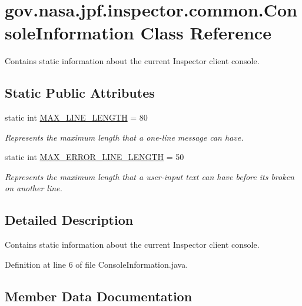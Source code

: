 \hypertarget{classgov_1_1nasa_1_1jpf_1_1inspector_1_1common_1_1_console_information}{}\section{gov.\+nasa.\+jpf.\+inspector.\+common.\+Console\+Information Class Reference}
\label{classgov_1_1nasa_1_1jpf_1_1inspector_1_1common_1_1_console_information}


Contains static information about the current Inspector client console.  


\subsection*{Static Public Attributes}
\begin{DoxyCompactItemize}
\item 
static int \hyperlink{classgov_1_1nasa_1_1jpf_1_1inspector_1_1common_1_1_console_information_a57d4710532b71af31cf8fedc417384fc}{M\+A\+X\+\_\+\+L\+I\+N\+E\+\_\+\+L\+E\+N\+G\+TH} = 80
\begin{DoxyCompactList}\small\item\em Represents the maximum length that a one-\/line message can have. \end{DoxyCompactList}\item 
static int \hyperlink{classgov_1_1nasa_1_1jpf_1_1inspector_1_1common_1_1_console_information_ac16e68639ca5e13db2dab0aacbbf3ca8}{M\+A\+X\+\_\+\+E\+R\+R\+O\+R\+\_\+\+L\+I\+N\+E\+\_\+\+L\+E\+N\+G\+TH} = 50
\begin{DoxyCompactList}\small\item\em Represents the maximum length that a user-\/input text can have before it\textquotesingle{}s broken on another line. \end{DoxyCompactList}\end{DoxyCompactItemize}


\subsection{Detailed Description}
Contains static information about the current Inspector client console. 

Definition at line 6 of file Console\+Information.\+java.



\subsection{Member Data Documentation}
